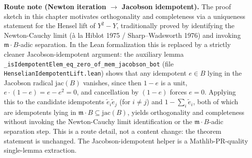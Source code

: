 \medskip\noindent\textbf{Route note (Newton iteration $\to$ Jacobson
idempotent).} The proof sketch in this chapter motivates orthogonality
and completeness via a uniqueness statement for the Hensel lift of
$Y^2 - Y$, traditionally proved by identifying the Newton-Cauchy
limit (à la Hiblot 1975 / Sharp--Wadsworth 1976) and invoking
$\mathfrak{m} \cdot B$-adic separation. In the Lean formalization
this is replaced by a strictly cleaner Jacobson-idempotent argument:
the auxiliary lemma
\texttt{\_isIdempotentElem\_eq\_zero\_of\_mem\_jacobson\_bot}
(file \texttt{HenselianIdempotentLift.lean}) shows that any idempotent
$e \in B$ lying in the Jacobson radical $\mathrm{jac}(B)$ vanishes,
since then $1 - e$ is a unit, $e \cdot (1 - e) = e - e^2 = 0$, and
cancellation by $(1 - e)$ forces $e = 0$. Applying this to the
candidate idempotents $\tilde e_i \tilde e_j$ (for $i \ne j$) and
$1 - \sum_i \tilde e_i$, both of which are idempotents lying in
$\mathfrak{m} \cdot B \subseteq \mathrm{jac}(B)$, yields orthogonality
and completeness without invoking the Newton-Cauchy limit
identification or the $\mathfrak{m} \cdot B$-adic separation step.
This is a route detail, not a content change: the theorem statement
is unchanged. The Jacobson-idempotent helper is a Mathlib-PR-quality
single-lemma extraction.
